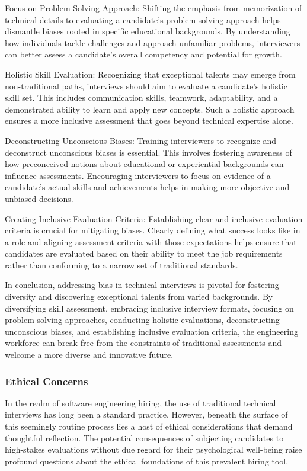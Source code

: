 \documentclass[
    a4paper, %
    10pt, %
    unnumberedsections, %
    twoside, %
]{LTJournalArticle}
\begin{document}
Focus on Problem-Solving Approach:
Shifting the emphasis from memorization of technical details to evaluating a candidate's problem-solving approach helps dismantle biases rooted in specific educational backgrounds. By understanding how individuals tackle challenges and approach unfamiliar problems, interviewers can better assess a candidate's overall competency and potential for growth.

Holistic Skill Evaluation:
Recognizing that exceptional talents may emerge from non-traditional paths, interviews should aim to evaluate a candidate's holistic skill set. This includes communication skills, teamwork, adaptability, and a demonstrated ability to learn and apply new concepts. Such a holistic approach ensures a more inclusive assessment that goes beyond technical expertise alone.

Deconstructing Unconscious Biases:
Training interviewers to recognize and deconstruct unconscious biases is essential. This involves fostering awareness of how preconceived notions about educational or experiential backgrounds can influence assessments. Encouraging interviewers to focus on evidence of a candidate's actual skills and achievements helps in making more objective and unbiased decisions.

Creating Inclusive Evaluation Criteria:
Establishing clear and inclusive evaluation criteria is crucial for mitigating biases. Clearly defining what success looks like in a role and aligning assessment criteria with those expectations helps ensure that candidates are evaluated based on their ability to meet the job requirements rather than conforming to a narrow set of traditional standards.

In conclusion, addressing bias in technical interviews is pivotal for fostering diversity and discovering exceptional talents from varied backgrounds. By diversifying skill assessment, embracing inclusive interview formats, focusing on problem-solving approaches, conducting holistic evaluations, deconstructing unconscious biases, and establishing inclusive evaluation criteria, the engineering workforce can break free from the constraints of traditional assessments and welcome a more diverse and innovative future.

\subsubsection*{Ethical Concerns}

In the realm of software engineering hiring, the use of traditional technical interviews has long been a standard practice. However, beneath the surface of this seemingly routine process lies a host of ethical considerations that demand thoughtful reflection. The potential consequences of subjecting candidates to high-stakes evaluations without due regard for their psychological well-being raise profound questions about the ethical foundations of this prevalent hiring tool.
\end{document}
